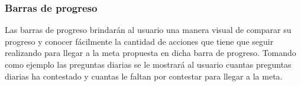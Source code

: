 \subsubsection{Barras de progreso}

Las barras de progreso brindarán al usuario una manera visual de comparar su progreso y conocer fácilmente la cantidad de acciones que tiene que seguir realizando para llegar a la meta propuesta en dicha barra de progreso. Tomando como ejemplo las preguntas diarias se le mostrará al usuario cuantas preguntas diarias ha contestado y cuantas le faltan por contestar para llegar a la meta.


%


